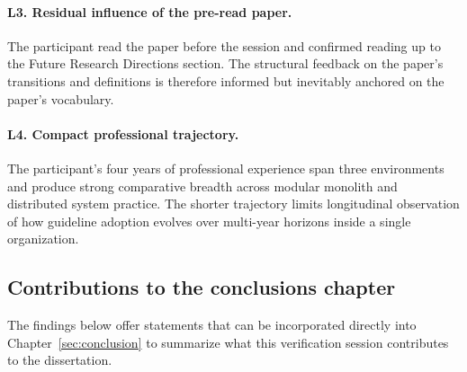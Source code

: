 \paragraph*{L3. Residual influence of the pre-read paper.} The participant read the paper before the session and confirmed reading up to the Future Research Directions section. The structural feedback on the paper's transitions and definitions is therefore informed but inevitably anchored on the paper's vocabulary.

\paragraph*{L4. Compact professional trajectory.} The participant's four years of professional experience span three environments and produce strong comparative breadth across modular monolith and distributed system practice. The shorter trajectory limits longitudinal observation of how guideline adoption evolves over multi-year horizons inside a single organization.

\subsection*{Contributions to the conclusions chapter}

The findings below offer statements that can be incorporated directly into Chapter~\ref{sec:conclusion} to summarize what this verification session contributes to the dissertation.

